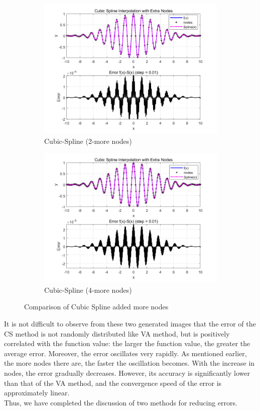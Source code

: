 \documentclass[11pt]{article}
\begin{document}
\FloatBarrier
\begin{figure}[H]
  \centering
  \begin{subfigure}[t]{0.48\textwidth}
    \centering
    \includegraphics[width=\textwidth]{CS3.png}
    \caption{Cubic-Spline (2-more nodes)}
    \label{fig:nev_whole00}
  \end{subfigure}
  \hfill
  \begin{subfigure}[t]{0.48\textwidth}
    \centering
    \includegraphics[width=\textwidth]{CS4.png}
    \caption{Cubic-Spline (4-more nodes)}
    \label{fig:nev_small00}
  \end{subfigure}
  \caption{Comparison of Cubic Spline added more nodes}
  \label{fig:nev_compare00}
\end{figure}
\FloatBarrier
It is not difficult to observe from these two generated images that the error of the CS method is not randomly distributed like VA method, 
but is positively correlated with the function value: the larger the function value, the greater the average error. Moreover, the error 
oscillates very rapidly. As mentioned earlier, the more nodes there are, the faster the oscillation becomes. With the increase in nodes, 
the error gradually decreases. However, its accuracy is significantly lower than that of the VA method, and the convergence speed of the 
error is approximately linear.\\
Thus, we have completed the discussion of two methods for reducing errors.
\end{document}
